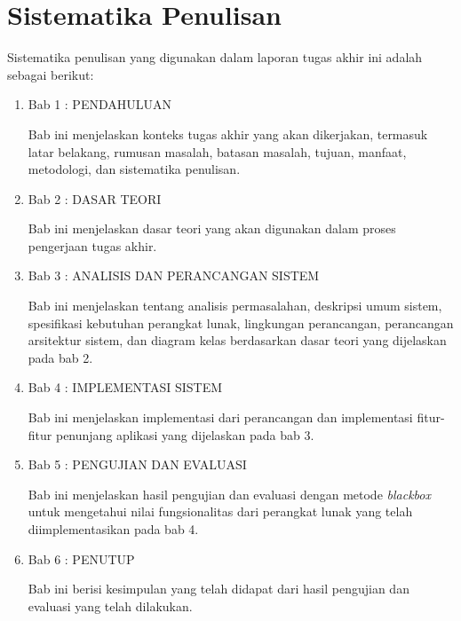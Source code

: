 \section {Sistematika Penulisan}
Sistematika penulisan yang digunakan dalam laporan tugas akhir ini adalah sebagai berikut:
\begin{enumerate}
\item Bab 1 : PENDAHULUAN
\par Bab ini menjelaskan konteks tugas akhir yang akan dikerjakan, termasuk latar belakang, rumusan masalah, batasan masalah, tujuan, manfaat, metodologi, dan sistematika penulisan.
\item Bab 2 : DASAR TEORI
\par Bab ini menjelaskan dasar teori yang akan digunakan dalam proses pengerjaan tugas akhir.
\item Bab 3 : ANALISIS DAN PERANCANGAN SISTEM
\par Bab ini menjelaskan tentang analisis permasalahan, deskripsi umum sistem, spesifikasi kebutuhan perangkat lunak, lingkungan perancangan, perancangan arsitektur sistem, dan diagram kelas berdasarkan dasar teori yang dijelaskan pada bab 2.
\item Bab 4 : IMPLEMENTASI SISTEM
\par Bab ini menjelaskan implementasi dari perancangan dan implementasi fitur-fitur penunjang aplikasi yang dijelaskan pada bab 3.
\item Bab 5 : PENGUJIAN DAN EVALUASI
\par Bab ini menjelaskan hasil pengujian dan evaluasi dengan metode \textit{blackbox} untuk mengetahui nilai fungsionalitas dari perangkat lunak yang telah diimplementasikan pada bab 4.
\item Bab 6 : PENUTUP
\par Bab ini berisi kesimpulan yang telah didapat dari hasil pengujian dan evaluasi yang telah dilakukan.
\end{enumerate}
